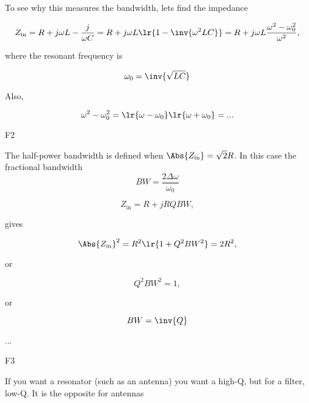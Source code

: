To see why this measures the bandwidth, lets find the impedance

\begin{dmath}\label{eqn:uwavesDeck8ResonatorQfactorCore:160}
Z_{\textrm{in}} 
= R + j \omega L - \frac{j}{\omega C}
= R + j \omega L \lr{ 1 - \inv{\omega^2 L C} }
= R + j \omega L \frac{\omega^2 - \omega_0^2}{\omega^2}, 
\end{dmath}

where the resonant frequency is

\begin{dmath}\label{eqn:uwavesDeck8ResonatorQfactorCore:180}
\omega_0 = \inv{\sqrt{LC}}
\end{dmath}

Also, 

\begin{dmath}\label{eqn:uwavesDeck8ResonatorQfactorCore:200}
\omega^2 - \omega_0^2 = \lr{ \omega - \omega_0 }\lr{ \omega + \omega_0 }
= 
...
\end{dmath}

F2

The half-power bandwidth is defined when \( \Abs{Z_{\textrm{in}}} = \sqrt{2} R \).  In this case the fractional bandwidth 
\begin{dmath}\label{eqn:uwavesDeck8ResonatorQfactorCore:220}
BW = \frac{2 \Delta \omega}{\omega_0}
\end{dmath}

\begin{dmath}\label{eqn:uwavesDeck8ResonatorQfactorCore:240}
Z_{\textrm{in}} = R + j R Q BW, 
\end{dmath}

gives

\begin{dmath}\label{eqn:uwavesDeck8ResonatorQfactorCore:260}
\Abs{Z_{\textrm{in}}}^2 = R^2\lr{ 1 + Q^2 BW^2 } = 2 R^2,
\end{dmath}

or

\begin{dmath}\label{eqn:uwavesDeck8ResonatorQfactorCore:280}
Q^2 BW^2 = 1,
\end{dmath}

or

\begin{dmath}\label{eqn:uwavesDeck8ResonatorQfactorCore:300}
BW = \inv{Q}
\end{dmath}

...

F3

If you want a resonator (such as an antenna) you want a high-Q, but for a filter, low-Q.  It is the opposite for antennas

